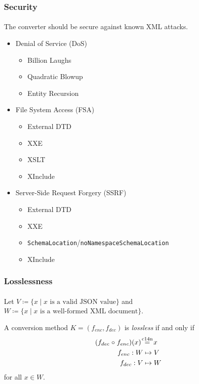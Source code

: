 \documentclass[
    alternativetitlepage=alternativ,
    cornerlogo=hgi_nds_logo2,
    sectionoverview,
]{rubpresentation}
\begin{document}
\begin{frame}
  \frametitle{Security}
  \framesubtitle{}
  The converter should be secure against known XML attacks.
  \begin{itemize}
    \item{} Denial of Service (DoS)
      \begin{itemize}
        \item{Billion Laughs}
        \item{Quadratic Blowup}
        \item{Entity Recursion}
      \end{itemize}
    \item{} File System Access (FSA)
      \begin{itemize}
        \item{External DTD}
        \item{XXE}
        \item{XSLT}
        \item{XInclude}
      \end{itemize}
    \item{} Server-Side Request Forgery (SSRF)
      \begin{itemize}
        \item{External DTD}
        \item{XXE}
        \item{\texttt{SchemaLocation}/\texttt{noNamespaceSchemaLocation}}
        \item{XInclude}
      \end{itemize}
  \end{itemize}
\end{frame}

\begin{frame}
  \frametitle{Losslessness}
  \framesubtitle{}
  \begin{definition}
      Let $V \coloneqq \{x \mid x\text{ is a valid } \text{JSON value}\}$ and $W \coloneqq \{x \mid x\text{ is a well-formed XML document}\}$.

      A conversion method $K = (f_{enc}, f_{dec})$ is \emph{lossless} if and only if
      \begin{align}
          (f_{dec}\mathrel{\circ} f_{enc})(x) \; &\mathbin{\stackrel{\mathmakebox[\widthof{=}]{\mathrm{c14n}}}{=}} \; x\\
          f_{enc}: W &\mapsto V\\
          f_{dec}: V &\mapsto W
      \end{align}
      for all $x \in W$.
  \end{definition}
\end{frame}
\end{document}
